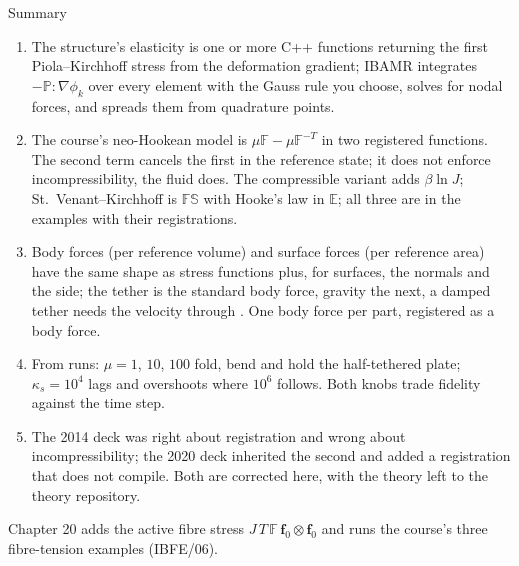 \documentclass[aspectratio=169,11pt]{beamer}
\begin{document}
\begin{frame}{Summary}
\label{fr:summary}
\footnotesize
\begin{enumerate}
  \item The structure's elasticity is one or more C++ functions returning the first Piola--Kirchhoff stress from the deformation gradient; IBAMR integrates $-\mathbb{P}:\nabla\phi_k$ over every element with the Gauss rule you choose, solves for nodal forces, and spreads them from quadrature points.
  \item The course's neo-Hookean model is $\mu\mathbb{F} - \mu\mathbb{F}^{-T}$ in two registered functions. The second term cancels the first in the reference state; it does not enforce incompressibility, the fluid does. The compressible variant adds $\beta\ln J$; St.\ Venant--Kirchhoff is $\mathbb{F}\mathbb{S}$ with Hooke's law in $\mathbb{E}$; all three are in the examples with their registrations.
  \item Body forces (per reference volume) and surface forces (per reference area) have the same shape as stress functions plus, for surfaces, the normals and the side; the tether is the standard body force, gravity the next, a damped tether needs the velocity through . One body force per part, registered as a body force.
  \item From runs: $\mu = 1$, $10$, $100$ fold, bend and hold the half-tethered plate; $\kappa_s = 10^4$ lags and overshoots where $10^6$ follows. Both knobs trade fidelity against the time step.
  \item The 2014 deck was right about registration and wrong about incompressibility; the 2020 deck inherited the second and added a registration that does not compile. Both are corrected here, with the theory left to the theory repository.
\end{enumerate}
\begin{homebox}
\footnotesize Chapter 20 adds the active fibre stress $J\,T\,\mathbb{F}\,\mathbf{f}_0\otimes\mathbf{f}_0$ and runs the course's three fibre-tension examples (IBFE/06).
\end{homebox}
\end{frame}
\end{document}
